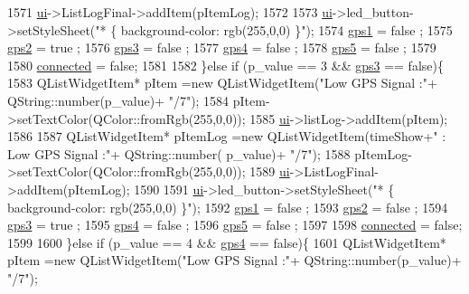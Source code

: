 \begin{DoxyCode}
{1571         \hyperlink{a00008_a6dc041ef6a2ffb329928d2913e8344e6}{ui}->ListLogFinal->addItem(pItemLog);
1572 
1573         \hyperlink{a00008_a6dc041ef6a2ffb329928d2913e8344e6}{ui}->led\_button->setStyleSheet(\textcolor{stringliteral}{"* \{ background-color: rgb(255,0,0) \}"});
1574         \hyperlink{a00008_a937eca780523827d07c23d8199f5034c}{gps1} = false ;
1575         \hyperlink{a00008_a5999aa93a3f88a1982f3a87c59f1fd98}{gps2} = true ;
1576         \hyperlink{a00008_a8bc76fea83b1435f743bc2aeb7f6dc4f}{gps3} = false ;
1577         \hyperlink{a00008_ac887c9acf42ed7f7c3688152440af6c7}{gps4} = false ;
1578         \hyperlink{a00008_a130b1f6fe6bc3f128b648457df10b010}{gps5} = false ;
1579 
1580         \hyperlink{a00008_ab36823025f12a809217f7771125658c2}{connected} = \textcolor{keyword}{false};
1581 
1582     \}\textcolor{keywordflow}{else} \textcolor{keywordflow}{if} (p\_value == 3 && \hyperlink{a00008_a8bc76fea83b1435f743bc2aeb7f6dc4f}{gps3} == \textcolor{keyword}{false})\{
1583         QListWidgetItem* pItem =\textcolor{keyword}{new} QListWidgetItem(\textcolor{stringliteral}{"Low GPS Signal :"}+ QString::number(p\_value)+ \textcolor{stringliteral}{"/7"});
1584         pItem->setTextColor(QColor::fromRgb(255,0,0));
1585         \hyperlink{a00008_a6dc041ef6a2ffb329928d2913e8344e6}{ui}->listLog->addItem(pItem);
1586 
1587         QListWidgetItem* pItemLog =\textcolor{keyword}{new} QListWidgetItem(timeShow+\textcolor{stringliteral}{" : Low GPS Signal :"}+ QString::number(
      p\_value)+ \textcolor{stringliteral}{"/7"});
1588         pItemLog->setTextColor(QColor::fromRgb(255,0,0));
1589         \hyperlink{a00008_a6dc041ef6a2ffb329928d2913e8344e6}{ui}->ListLogFinal->addItem(pItemLog);
1590 
1591         \hyperlink{a00008_a6dc041ef6a2ffb329928d2913e8344e6}{ui}->led\_button->setStyleSheet(\textcolor{stringliteral}{"* \{ background-color: rgb(255,0,0) \}"});
1592         \hyperlink{a00008_a937eca780523827d07c23d8199f5034c}{gps1} = false ;
1593         \hyperlink{a00008_a5999aa93a3f88a1982f3a87c59f1fd98}{gps2} = false ;
1594         \hyperlink{a00008_a8bc76fea83b1435f743bc2aeb7f6dc4f}{gps3} = true ;
1595         \hyperlink{a00008_ac887c9acf42ed7f7c3688152440af6c7}{gps4} = false ;
1596         \hyperlink{a00008_a130b1f6fe6bc3f128b648457df10b010}{gps5} = false ;
1597 
1598         \hyperlink{a00008_ab36823025f12a809217f7771125658c2}{connected} = \textcolor{keyword}{false};
1599 
1600     \}\textcolor{keywordflow}{else} \textcolor{keywordflow}{if} (p\_value == 4 && \hyperlink{a00008_ac887c9acf42ed7f7c3688152440af6c7}{gps4} == \textcolor{keyword}{false})\{
1601         QListWidgetItem* pItem =\textcolor{keyword}{new} QListWidgetItem(\textcolor{stringliteral}{"Low GPS Signal :"}+ QString::number(p\_value)+ \textcolor{stringliteral}{"/7"});
}
\end{DoxyCode}

